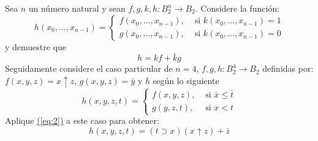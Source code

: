\begin{exercise}
  Sea $n$ un número natural y sean
  $f,g,k,h\colon B_{2}^{n}\longrightarrow B_{2}$. Considere la
  función:
  \begin{equation*}
    h(x_{0},\ldots,x_{n-1})=
    \begin{cases}
      f(x_{0},\ldots,x_{n-1}),&\text{ si } k(x_{0},\ldots,x_{n-1})=1\\
      g(x_{0},\ldots,x_{n-1}),&\text{ si } k(x_{0},\ldots,x_{n-1})=0
    \end{cases}
  \end{equation*}
  y demuestre que 
  \begin{equation}
    \label{eq:2}
    h=kf+\bar{k}g
  \end{equation}
  Seguidamente considere el caso
  particular de $n=4$, $f,g,h\colon B_{2}^{4}\longrightarrow B_{2}$
  definidas por: $f(x,y,z)=x\uparrow z$, $g(x,y,z)=\bar{y}$ y $h$
  según lo siguiente
  \begin{equation*}
    h(x,y,z,t)=
    \begin{cases}
      f(x,y,z),& \text{ si }\bar{x}\leq\bar{t}\\
      g(y,z,t),& \text{ si }x<t 
    \end{cases}
  \end{equation*}
  Aplique \hyperref[eq:2]{(\ref*{eq:2})} a este caso para obtener:
  \begin{equation}
    \label{eq:3}
    h(x,y,z,t)=(t\supset x)(x\uparrow z)+\bar{z}
  \end{equation}
  \end{exercise}

